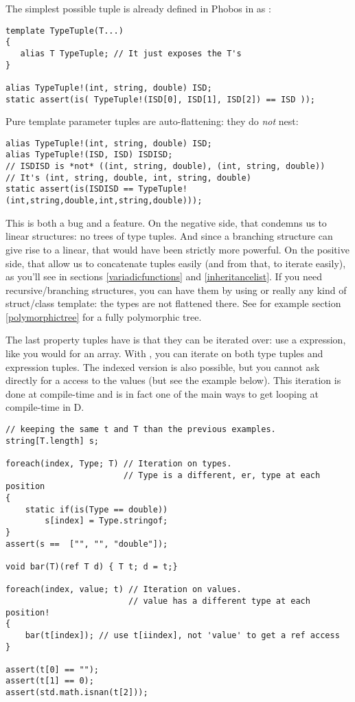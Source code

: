 The simplest possible tuple is already defined in Phobos in  as :

\begin{verbatim}
template TypeTuple(T...)
{
   alias T TypeTuple; // It just exposes the T's
}

alias TypeTuple!(int, string, double) ISD;
static assert(is( TypeTuple!(ISD[0], ISD[1], ISD[2]) == ISD ));
\end{verbatim}

Pure template parameter tuples are auto-flattening: they do \emph{not} nest:

\begin{verbatim}
alias TypeTuple!(int, string, double) ISD;
alias TypeTuple!(ISD, ISD) ISDISD; 
// ISDISD is *not* ((int, string, double), (int, string, double))
// It's (int, string, double, int, string, double)
static assert(is(ISDISD == TypeTuple!(int,string,double,int,string,double)));
\end{verbatim}

This is both a bug and a feature. On the negative side, that condemns us to linear structures: no trees of type tuples. And since a branching structure can give rise to a linear, that would have been strictly more powerful. On the positive side, that allow us to concatenate tuples easily (and from that, to iterate easily), as you'll see in sections \ref{variadicfunctions} and \ref{inheritancelist}. If you need recursive/branching structures, you can have them by using  or really any kind of struct/class template: the types are not flattened there. See for example section \ref{polymorphictree} for a fully polymorphic tree.

The last property tuples have is that they can be iterated over: use a  expression, like you would for an array. With , you can iterate on both type tuples and expression tuples. The indexed version is also possible, but you cannot ask directly for a  access to the values (but see the example below). This iteration is done at compile-time and is in fact one of the main ways to get looping at compile-time in D.

\begin{verbatim}
// keeping the same t and T than the previous examples.
string[T.length] s;

foreach(index, Type; T) // Iteration on types.
                        // Type is a different, er, type at each position
{
    static if(is(Type == double))
        s[index] = Type.stringof;
}
assert(s ==  ["", "", "double"]);

void bar(T)(ref T d) { T t; d = t;}

foreach(index, value; t) // Iteration on values.
                         // value has a different type at each position!
{
    bar(t[index]); // use t[iindex], not 'value' to get a ref access
}

assert(t[0] == "");
assert(t[1] == 0);
assert(std.math.isnan(t[2]));
\end{verbatim}

